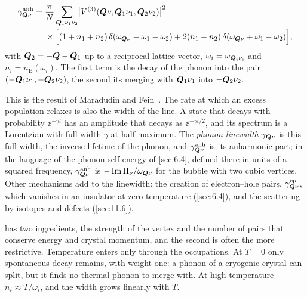 \begin{keyresult}
\begin{equation}
  \begin{split}
  \gamma^{\mathrm{anh}}_{\bm{Q}\nu} = {}& \frac{\pi}{N}\sum_{\bm{Q}_1\nu_1\nu_2}\bigl|V^{(3)}(\bm{Q}\nu,\bm{Q}_1\nu_1,\bm{Q}_2\nu_2)\bigr|^2
  \\ &\times\Bigl[(1 + n_1 + n_2)\,\delta(\omega_{\bm{Q}\nu} - \omega_1 - \omega_2) + 2(n_1 - n_2)\,\delta(\omega_{\bm{Q}\nu} + \omega_1 - \omega_2)\Bigr] ,
  \end{split}
  \label{eq:5.7-gamma}
\end{equation}
with $\bm{Q}_2 = -\bm{Q} - \bm{Q}_1$ up to a reciprocal-lattice vector, $\omega_i = \omega_{\bm{Q}_i\nu_i}$ and $n_i = n_{\mathrm{B}}(\omega_i)$. The first term is the decay of the phonon into the pair $(-\bm{Q}_1\nu_1, -\bm{Q}_2\nu_2)$, the second its merging with $\bm{Q}_1\nu_1$ into $-\bm{Q}_2\nu_2$.
\end{keyresult}
This is the result of Maradudin and Fein~\cites{maradudin1962scattering}[Eq.~(6)]{paulatto2013anharmonic}. The rate at which an excess population relaxes is also the width of the line. A state that decays with probability $\ee^{-\gamma t}$ has an amplitude that decays as $\ee^{-\gamma t/2}$, and its spectrum is a Lorentzian with full width $\gamma$ at half maximum. The \emph{phonon linewidth} $\gamma_{\bm{Q}\nu}$ is this full width, the inverse lifetime of the phonon, and $\gamma^{\mathrm{anh}}_{\bm{Q}\nu}$ is its anharmonic part; in the language of the phonon self-energy of \cref{sec:6.4}, defined there in units of a squared frequency, $\gamma^{\mathrm{anh}}_{\bm{Q}\nu}$ is $-\operatorname{Im}\Pi_\nu/\omega_{\bm{Q}\nu}$ for the bubble with two cubic vertices. Other mechanisms add to the linewidth: the creation of electron--hole pairs, $\gamma^{\mathrm{ep}}_{\bm{Q}\nu}$, which vanishes in an insulator at zero temperature (\cref{sec:6.4}), and the scattering by isotopes and defects (\cref{sec:11.6}).

 has two ingredients, the strength of the vertex and the number of pairs that conserve energy and crystal momentum, and the second is often the more restrictive. Temperature enters only through the occupations. At $T = 0$ only spontaneous decay remains, with weight one: a phonon of a cryogenic crystal can split, but it finds no thermal phonon to merge with. At high temperature $n_i \approx T/\omega_i$, and the width grows linearly with $T$.

